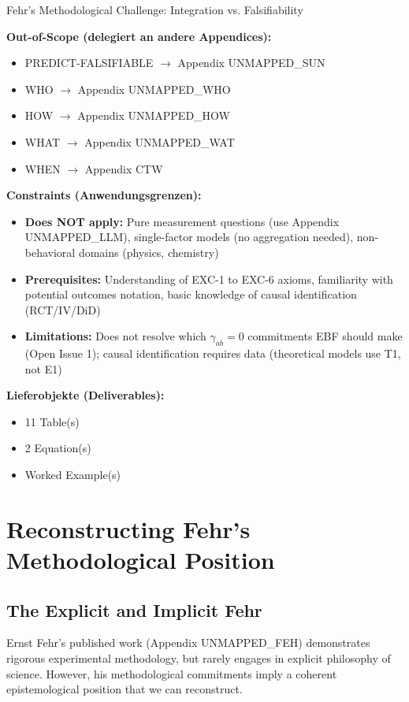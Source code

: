 \begin{chapter}{Fehr's Methodological Challenge: Integration vs. Falsifiability}
\begin{tcolorbox}[
    colback=orange!5!white,
    colframe=orange!75!black,
    title={\textbf{Appendix Scope: Ziel / In-Scope / Out-of-Scope / Constraints}},
    fonttitle=\bfseries
]
\textbf{Out-of-Scope (delegiert an andere Appendices):}
\begin{itemize}[nosep]
    \item PREDICT-FALSIFIABLE $\rightarrow$ Appendix UNMAPPED_SUN
    \item WHO $\rightarrow$ Appendix UNMAPPED_WHO
    \item HOW $\rightarrow$ Appendix UNMAPPED_HOW
    \item WHAT $\rightarrow$ Appendix UNMAPPED_WAT
    \item WHEN $\rightarrow$ Appendix CTW
\end{itemize}

\textbf{Constraints (Anwendungsgrenzen):}
\begin{itemize}[nosep]
    \item \textbf{Does NOT apply:} Pure measurement questions (use Appendix UNMAPPED_LLM), single-factor models (no aggregation needed), non-behavioral domains (physics, chemistry)
    \item \textbf{Prerequisites:} Understanding of EXC-1 to EXC-6 axioms, familiarity with potential outcomes notation, basic knowledge of causal identification (RCT/IV/DiD)
    \item \textbf{Limitations:} Does not resolve which $\gamma_{ab} = 0$ commitments EBF should make (Open Issue 1); causal identification requires data (theoretical models use T1, not E1)
\end{itemize}

\textbf{Lieferobjekte (Deliverables):}
\begin{itemize}[nosep]
    \item 11 Table(s)
    \item 2 Equation(s)
    \item Worked Example(s)
\end{itemize}

\end{tcolorbox}


\section{Reconstructing Fehr's Methodological Position}
\label{sec:fehr-position}

\subsection{The Explicit and Implicit Fehr}

Ernst Fehr's published work (Appendix UNMAPPED_FEH) demonstrates rigorous experimental methodology, but rarely engages in explicit philosophy of science. However, his methodological commitments imply a coherent epistemological position that we can reconstruct.


\end{chapter}

